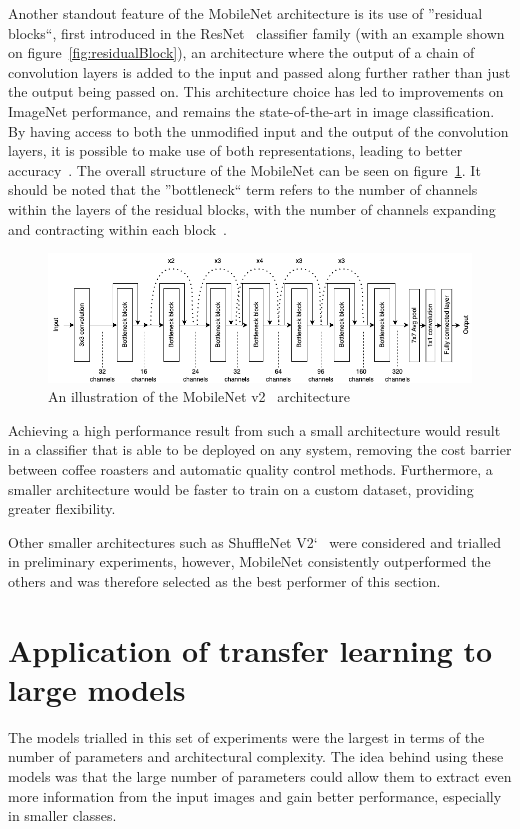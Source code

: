 Another standout feature of the MobileNet architecture is its use of ''residual blocks``, first introduced in the ResNet~\cite{resNet} classifier family (with an example shown on figure~\ref{fig:residualBlock}), an architecture where the output of
a chain of convolution layers is added to the input and passed along further rather than just the output being passed on.
This architecture choice has led to improvements on ImageNet performance, and remains the state-of-the-art in image classification.
By having access to both the unmodified input and the output of the convolution layers, it is possible to make use of both representations,
leading to better accuracy~\cite{resNet}.
The overall structure of the MobileNet can be seen on figure~\ref{fig:mobilenetSketch}.
It should be noted that the ''bottleneck`` term refers to the number of channels within the layers of the residual blocks,
with the number of channels expanding and contracting within each block~\cite{mobileNet}.

\begin{figure}[!ht]
    \centering
    \includegraphics[width=\textwidth]{figures/methodology/mobilenet_diagram}
    \caption[An illustration of the MobileNet v2 architecture]
    {An illustration of the MobileNet v2~\cite{mobileNet} architecture}
    \label{fig:mobilenetSketch}
\end{figure}

Achieving a high performance result from such a small architecture would result in a classifier that is able to be deployed
on any system, removing the cost barrier between coffee roasters and automatic quality control methods.
Furthermore, a smaller architecture would be faster to train on a custom dataset, providing greater flexibility.

Other smaller architectures such as ShuffleNet V2`~\cite{shuffleNet} were considered and trialled in preliminary experiments,
however, MobileNet consistently outperformed the others and was therefore selected as the best performer of this section.


\section{Application of transfer learning to large models}
\label{sec:transfer-learning}
The models trialled in this set of experiments were the largest in terms of the number of parameters and
architectural complexity.
The idea behind using these models was that the large number of parameters could allow them to extract even more information
from the input images and gain better performance, especially in smaller classes.

